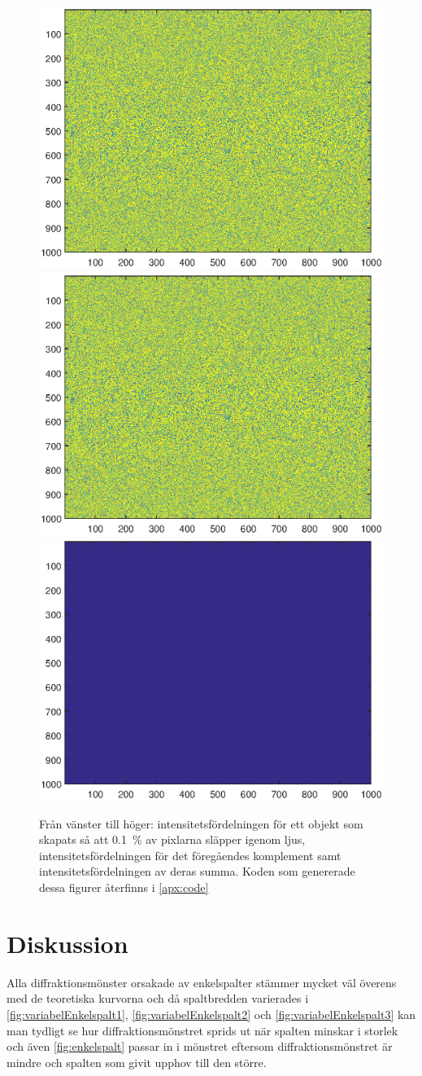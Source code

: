 \documentclass[a4paper]{article}
\begin{document}
\begin{figure}[h!]
	\centering
	\includegraphics[width=0.32\linewidth]{Data/Figurer/simuleringBabinet1.eps}
	\includegraphics[width=0.32\linewidth]{Data/Figurer/simuleringBabinet2.eps}
	\includegraphics[width=0.32\linewidth]{Data/Figurer/simuleringBabinet3.eps}
	\caption{Från vänster till höger: intensitetsfördelningen för ett objekt som skapats så att \SI{0.1}{\percent} av pixlarna släpper igenom ljus, intensitetsfördelningen för det föregåendes komplement samt intensitetsfördelningen av deras summa. Koden som genererade dessa figurer återfinns i \autoref{apx:code}}
	\label{fig:simuleringBabinet}
\end{figure}

\FloatBarrier

\section{Diskussion}
  
  Alla diffraktionsmönster orsakade av enkelspalter stämmer mycket väl överens med de teoretiska kurvorna och då spaltbredden varierades i \autoref{fig:variabelEnkelspalt1}, \autoref{fig:variabelEnkelspalt2} och \autoref{fig:variabelEnkelspalt3} kan man tydligt se hur diffraktionsmönstret sprids ut när spalten minskar i storlek och även \autoref{fig:enkelspalt} passar in i mönstret eftersom diffraktionsmönstret är mindre och spalten som givit upphov till den större.
  
\end{document}
